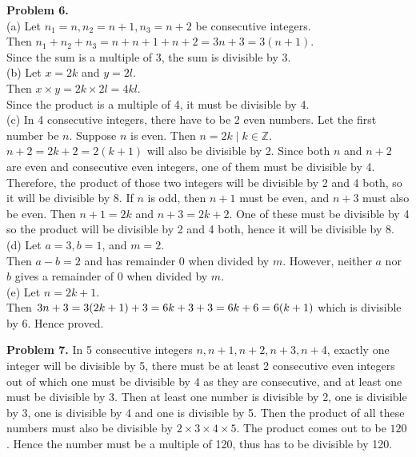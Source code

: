 \documentclass[addpoints]{exam}
\begin{document}
\begin{questions}
\begin{solution}
        \textbf{Problem 6.} \\ 
        (a) Let $n_1 = n, n_2 = n + 1, n_3 = n + 2$ be consecutive integers. \\  
        Then $ n_1 + n_2 + n_3 = n + n + 1 + n + 2 = 3n + 3 = 3(n + 1)$. \\ 
        Since the sum is a multiple of 3, the sum is divisible by 3. \\ 
        (b) Let $ x = 2k $ and $ y = 2l $. \\ 
        Then $ x \times y = 2k \times 2l = 4kl $. \\ Since the product is a multiple of 4, it must be divisible by 4. \\ 
        (c) In 4 consecutive integers, there have to be 2 even numbers. Let the first number be $n$. Suppose $n$ is even. Then $n = 2k \; | \; k \in \mathbb{Z} $. $ n + 2 = 2k + 2 = 2(k + 1) $ will also be divisible by 2. Since both $n$ and $ n + 2 $ are even and consecutive even integers, one of them must be divisible by 4. Therefore, the product of those two integers will be divisible by 2 and 4 both, so it will be divisible by 8. 
        If $n$ is odd, then $ n + 1 $ must be even, and $ n + 3 $ must also be even. Then $ n + 1 = 2k $ and $ n + 3 = 2k + 2 $. One of these must be divisible by 4 so the product will be divisible by 2 and 4 both, hence it will be divisible by 8. \\ 
        (d) Let $ a = 3, b = 1 $, and $ m = 2 $. \\ 
        Then $ a - b = 2 $ and has remainder 0 when divided by $m$. However, neither $a$ nor $b$ gives a remainder of 0 when divided by $m$. \\ 
        (e) Let $ n = 2k + 1 $. \\ 
        Then $ 3n + 3 = 3(2k + 1) + 3 \\ 
        = 6k + 3 + 3 \\ 
        = 6k + 6 \\ 
        = 6(k + 1) $ which is divisible by 6. Hence proved.

        \textbf{Problem 7.} In 5 consecutive integers $ n, n+1, n+2, n+3, n+4 $, exactly one integer will be divisible by 5, there must be at least 2 consecutive even integers out of which one must be divisible by 4 as they are consecutive, and at least one must be divisible by 3. Then at least one number is divisible by 2, one is divisible by 3, one is divisible by 4 and one is divisible by 5. Then the product of all these numbers must also be divisible by $ 2 \times 3 \times 4 \times 5 $. The product comes out to be $ 120 $. Hence the number must be a multiple of 120, thus has to be divisible by 120.


\end{solution}
\end{questions}
\end{document}

